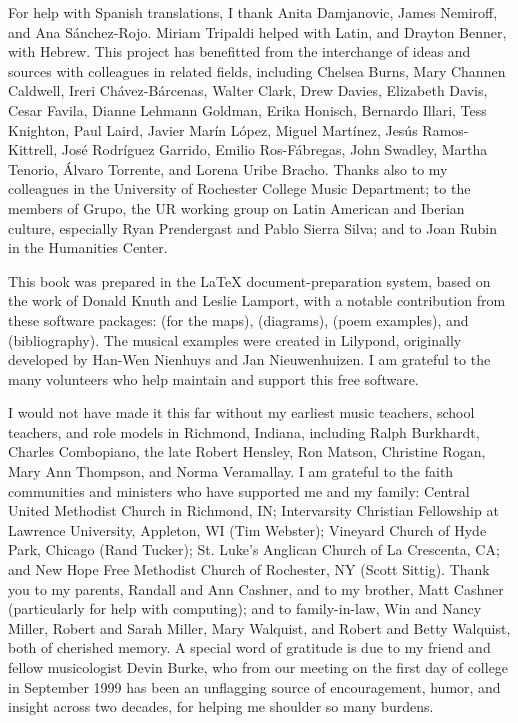 For help with Spanish translations, I thank Anita Damjanovic, James Nemiroff,
and Ana Sánchez-Rojo. 
Miriam Tripaldi helped with Latin, and Drayton Benner, with Hebrew.
This project has benefitted from the interchange of ideas and sources with
colleagues in related fields, including Chelsea Burns, Mary Channen Caldwell,
Ireri Chávez-Bárcenas, Walter Clark, Drew Davies, Elizabeth Davis, Cesar Favila,
Dianne Lehmann Goldman, Erika Honisch, Bernardo Illari, Tess Knighton, 
Paul Laird, Javier Marín López, Miguel Martínez, Jesús Ramos-Kittrell, José
Rodríguez Garrido, Emilio Ros-Fábregas, John Swadley, Martha Tenorio, 
Álvaro Torrente, and Lorena Uribe Bracho.
Thanks also to my colleagues in the University of Rochester College Music
Department; to the members of Grupo, the UR working group on Latin American
and Iberian culture, especially Ryan Prendergast and Pablo Sierra
Silva; and to Joan Rubin in the Humanities Center.

This book was prepared in the \LaTeX{} document-preparation system, based on
the work of Donald Knuth and Leslie Lamport, with a notable contribution from
these software packages:
 (for the maps),  (diagrams), 
(poem examples), and  (bibliography).
The musical examples were created in Lilypond, originally developed by Han-Wen
Nienhuys and Jan Nieuwenhuizen.
I am grateful to the many volunteers who help maintain and support this free
software.

I would not have made it this far without my earliest music teachers, school
teachers, and role models in Richmond, Indiana, including 
Ralph Burkhardt, 
Charles Combopiano, 
the late Robert Hensley, 
Ron Matson, 
Christine Rogan, 
Mary Ann Thompson,
and 
Norma Veramallay.
I am grateful to the faith communities and ministers who have supported me and
my family:
Central United Methodist Church in Richmond, IN; 
Intervarsity Christian Fellowship at Lawrence University, Appleton, WI (Tim
Webster); 
Vineyard Church of Hyde Park, Chicago (Rand Tucker); 
St. Luke's Anglican Church of La Crescenta, CA; 
and New Hope Free Methodist Church of Rochester, NY (Scott Sittig).
Thank you to my parents, Randall and Ann Cashner, and to
my brother, Matt Cashner (particularly for help with computing); and to
family-in-law, Win and Nancy Miller, Robert and Sarah Miller, Mary Walquist,
and Robert and Betty Walquist, both of cherished memory.
A special word of gratitude is due to my friend and fellow musicologist Devin
Burke, who from our meeting on the first day of college in September 1999 has
been an unflagging source of encouragement, humor, and insight across two
decades, for helping me shoulder so many burdens.

